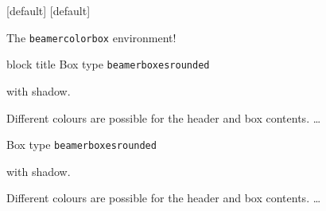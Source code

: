 \documentclass{beamer}
\begin{document}
\begin{frame}

\begin{minipage}{5cm}
[default]
[default]
\begin{block}{}
    The \texttt{beamercolorbox} environment!
\end{block}
\end{minipage}

\begin{exampleblock}{block title}
 Box type \texttt{beamerboxesrounded}

 with shadow.

 Different colours are possible for the header and box contents. \ldots
\end{exampleblock}

\begin{example}
 Box type \texttt{beamerboxesrounded}

 with shadow.

 Different colours are possible for the header and box contents. \ldots
\end{example}

\end{frame}
\end{document}
